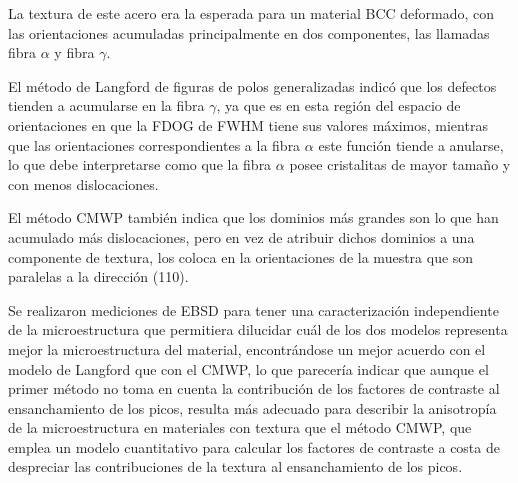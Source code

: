 La textura de este acero era la esperada para un material BCC deformado, con las orientaciones acumuladas principalmente en dos componentes, las llamadas fibra $\alpha$ y fibra $\gamma$.

El método de Langford de figuras de polos generalizadas indicó que los defectos tienden a acumularse en la fibra $\gamma$, ya que es en esta región del espacio de orientaciones en que la FDOG de FWHM tiene sus valores máximos, mientras que las orientaciones correspondientes a la fibra $\alpha$ este función tiende a anularse, lo que debe interpretarse como que la fibra $\alpha$ posee cristalitas de mayor tamaño y con menos dislocaciones.

El método CMWP también indica que los dominios más grandes son lo que han acumulado más dislocaciones, pero en vez de atribuir dichos dominios a una componente de textura, los coloca en la orientaciones de la muestra que son paralelas a la dirección (110).

Se realizaron mediciones de EBSD para tener una caracterización independiente de la microestructura que permitiera dilucidar cuál de los dos modelos representa mejor la microestructura del material, encontrándose un mejor acuerdo con el modelo de Langford que con el CMWP, lo que parecería indicar que aunque el primer método no toma en cuenta la contribución de los factores de contraste al ensanchamiento de los picos, resulta más adecuado para describir la anisotropía de la microestructura en materiales con textura que el método CMWP, que emplea un modelo cuantitativo para calcular los factores de contraste a costa de despreciar las contribuciones de la textura al ensanchamiento de los picos.

